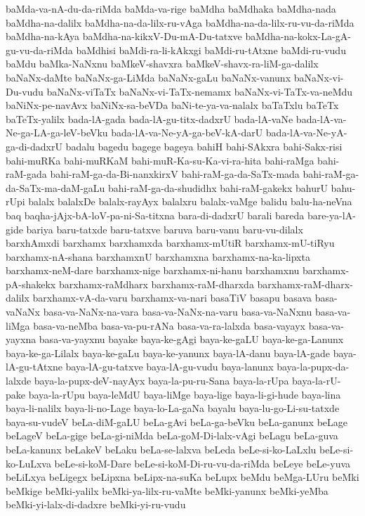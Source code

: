 {baMda-va-nA-du-da-riMda
baMda-va-rige
baMdha
baMdhaka
baMdha-nada
baMdha-na-dalilx
baMdha-na-da-lilx-ru-vAga
baMdha-na-da-lilx-ru-vu-da-riMda
baMdha-na-kAya
baMdha-na-kikxV-Du-mA-Du-tatxve
baMdha-na-kokx-La-gA-gu-vu-da-riMda
baMdhisi
baMdi-ra-li-kAkxgi
baMdi-ru-tAtxne
baMdi-ru-vudu
baMdu
baMka-NaNxnu
baMkeV-shavxra
baMkeV-shavx-ra-liM-ga-dalilx
baNaNx-daMte
baNaNx-ga-LiMda
baNaNx-gaLu
baNaNx-vanunx
baNaNx-vi-Du-vudu
baNaNx-viTaTx
baNaNx-vi-TaTx-nemamx
baNaNx-vi-TaTx-va-neMdu
baNiNx-pe-navAvx
baNiNx-sa-beVDa
baNi-te-ya-va-nalalx
baTaTxlu
baTeTx
baTeTx-yalilx
bada-lA-gada
bada-lA-gu-titx-dadxrU
bada-lA-vaNe
bada-lA-va-Ne-ga-LA-ga-leV-beVku
bada-lA-va-Ne-yA-ga-beV-kA-darU
bada-lA-va-Ne-yA-ga-di-dadxrU
badalu
bagedu
bagege
bageya
bahiH
bahi-SAkxra
bahi-Sakx-risi
bahi-muRKa
bahi-muRKaM
bahi-muR-Ka-su-Ka-vi-ra-hita
bahi-raMga
bahi-raM-gada
bahi-raM-ga-da-Bi-nanxkirxV
bahi-raM-ga-da-SaTx-mada
bahi-raM-ga-da-SaTx-ma-daM-gaLu
bahi-raM-ga-da-shudidhx
bahi-raM-gakekx
bahurU
bahu-rUpi
balalx
balalxDe
balalx-rayAyx
balalxru
balalx-vaMge
balidu
balu-ha-neVna
baq
baqha-jAjx-bA-loV-pa-ni-Sa-titxna
bara-di-dadxrU
barali
bareda
bare-ya-lA-gide
bariya
baru-tatxde
baru-tatxve
baruva
baru-vanu
baru-vu-dilalx
barxhAmxdi
barxhamx
barxhamxda
barxhamx-mUtiR
barxhamx-mU-tiRyu
barxhamx-nA-shana
barxhamxnU
barxhamxna
barxhamx-na-ka-lipxta
barxhamx-neM-dare
barxhamx-nige
barxhamx-ni-hanu
barxhamxnu
barxhamx-pA-shakekx
barxhamx-raMdharx
barxhamx-raM-dharxda
barxhamx-raM-dharx-dalilx
barxhamx-vA-da-varu
barxhamx-va-nari
basaTiV
basapu
basava
basa-vaNaNx
basa-va-NaNx-na-vara
basa-va-NaNx-na-varu
basa-va-NaNxnu
basa-va-liMga
basa-va-neMba
basa-va-pu-rANa
basa-va-ra-lalxda
basa-vayayx
basa-va-yayxna
basa-va-yayxnu
bayake
baya-ke-gAgi
baya-ke-gaLU
baya-ke-ga-Lanunx
baya-ke-ga-Lilalx
baya-ke-gaLu
baya-ke-yanunx
baya-lA-danu
baya-lA-gade
baya-lA-gu-tAtxne
baya-lA-gu-tatxve
baya-lA-gu-vudu
baya-lanunx
baya-la-pupx-da-lalxde
baya-la-pupx-deV-nayAyx
baya-la-pu-ru-Sana
baya-la-rUpa
baya-la-rU-pake
baya-la-rUpu
baya-leMdU
baya-liMge
baya-lige
baya-li-gi-hude
baya-lina
baya-li-nalilx
baya-li-no-Lage
baya-lo-La-gaNa
bayalu
baya-lu-go-Li-su-tatxde
baya-su-vudeV
beLa-diM-gaLU
beLa-gAvi
beLa-ga-beVku
beLa-ganunx
beLage
beLageV
beLa-gige
beLa-gi-niMda
beLa-goM-Di-lalx-vAgi
beLagu
beLa-guva
beLa-kanunx
beLakeV
beLaku
beLa-se-lalxva
beLeda
beLe-si-ko-LaLxlu
beLe-si-ko-LuLxva
beLe-si-koM-Dare
beLe-si-koM-Di-ru-vu-da-riMda
beLeye
beLe-yuva
beLiLxya
beLigegx
beLipxna
beLipx-na-suKa
beLupx
beMdu
beMga-LUru
beMki
beMkige
beMki-yalilx
beMki-ya-lilx-ru-vaMte
beMki-yanunx
beMki-yeMba
beMki-yi-lalx-di-dadxre
beMki-yi-ru-vudu
}
